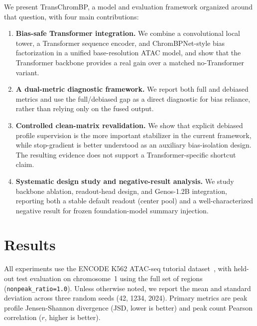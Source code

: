 \documentclass[11pt,a4paper]{article}
\begin{document}
We present TransChromBP, a model and evaluation framework organized
around that question, with four main contributions:

\begin{enumerate}[leftmargin=2em]
  \item \textbf{Bias-safe Transformer integration.} We combine a
  convolutional local tower, a Transformer sequence encoder, and
  ChromBPNet-style bias factorization in a unified base-resolution ATAC
  model, and show that the Transformer backbone provides a real gain
  over a matched no-Transformer variant.

  \item \textbf{A dual-metric diagnostic framework.} We report both full
  and debiased metrics and use the full/debiased gap as a direct
  diagnostic for bias reliance, rather than relying only on the fused
  output.

  \item \textbf{Controlled clean-matrix revalidation.} We show that
  explicit debiased profile supervision is the more important stabilizer
  in the current framework, while stop-gradient is better understood as
  an auxiliary bias-isolation design. The resulting evidence does not
  support a Transformer-specific shortcut claim.

  \item \textbf{Systematic design study and negative-result analysis.}
  We study backbone ablation, readout-head design, and Genos-1.2B
  integration, reporting both a stable default readout (center pool) and
  a well-characterized negative result for frozen foundation-model
  summary injection.
\end{enumerate}

\section{Results}
\label{sec:results}

All experiments use the ENCODE K562 ATAC-seq tutorial
dataset~\cite{pampari2023chrombpnet}, with held-out test evaluation on
chromosome~1 using the full set of regions (\texttt{nonpeak\_ratio=1.0}).
Unless otherwise noted, we report the mean and standard deviation across
three random seeds (42, 1234, 2024). Primary metrics are peak profile
Jensen-Shannon divergence (JSD, lower is better) and peak count Pearson
correlation ($r$, higher is better).
\end{document}
